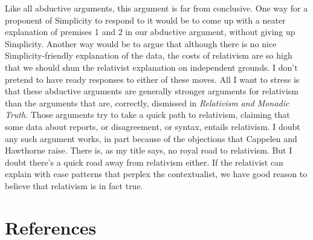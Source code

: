 \documentclass[
  11pt,
  letterpaper,
  DIV=11,
  numbers=noendperiod,
  twoside]{scrartcl}
\begin{document}
Like all abductive arguments, this argument is far from conclusive. One
way for a proponent of Simplicity to respond to it would be to come up
with a neater explanation of premises 1 and 2 in our abductive argument,
without giving up Simplicity. Another way would be to argue that
although there is no nice Simplicity-friendly explanation of the data,
the costs of relativism are so high that we should shun the relativist
explanation on independent grounds. I don't pretend to have ready
responses to either of these moves. All I want to stress is that these
abductive arguments are generally stronger arguments for relativism than
the arguments that are, correctly, dismissed in \emph{Relativism and
Monadic Truth}. Those arguments try to take a quick path to relativism,
claiming that some data about reports, or disagreement, or syntax,
entails relativism. I doubt any such argument works, in part because of
the objections that Cappelen and Hawthorne raise. There is, as my title
says, no royal road to relativism. But I doubt there's a quick road away
from relativism either. If the relativist can explain with ease patterns
that perplex the contextualist, we have good reason to believe that
relativism is in fact true.

\section*{References}\label{references}
\end{document}
